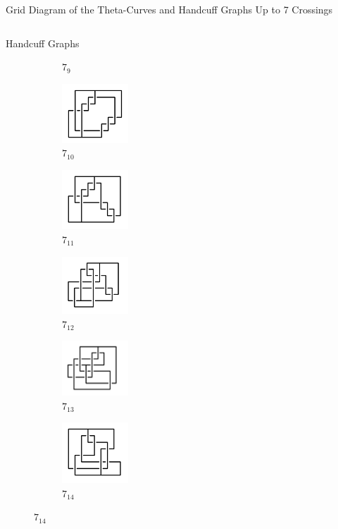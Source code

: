 \documentclass[final]{beamer}
\begin{document}
\begin{frame}[t]
\begin{alertblock}{Grid Diagram of the Theta-Curves and Handcuff Graphs Up to 7 Crossings}
\begin{columns}[t]
\begin{column}{0.3\textwidth}
\begin{alertblock}{Handcuff Graphs}
\begin{figure}
\begin{subfigure}{0.15\textwidth}
    \caption{$7_{9}$} 
    \end{subfigure}
    \begin{subfigure}{0.15\textwidth}
    \includegraphics[width=2.5cm]{../Midterm_Poster/grid_diagram/handcuff_7_10.png}
    \caption{$7_{10}$} 
    \end{subfigure}
    \begin{subfigure}{0.15\textwidth}
    \includegraphics[width=2.5cm]{../Midterm_Poster/grid_diagram/handcuff_7_11.png}
    \caption{$7_{11}$} 
    \end{subfigure}
    \begin{subfigure}{0.15\textwidth}
    \includegraphics[width=2.5cm]{../Midterm_Poster/grid_diagram/handcuff_7_12.png}
    \caption{$7_{12}$} 
    \end{subfigure}
    \begin{subfigure}{0.15\textwidth}
    \includegraphics[width=2.5cm]{../Midterm_Poster/grid_diagram/handcuff_7_13.png}
    \caption{$7_{13}$} 
    \end{subfigure}
    \begin{subfigure}{0.15\textwidth}
    \includegraphics[width=2.5cm]{../Midterm_Poster/grid_diagram/handcuff_7_14.png}
    \caption{$7_{14}$} 
    \end{subfigure}

\end{figure}
\end{alertblock}
\end{column}
\end{columns}
\end{alertblock}
\end{frame}
\end{document}
